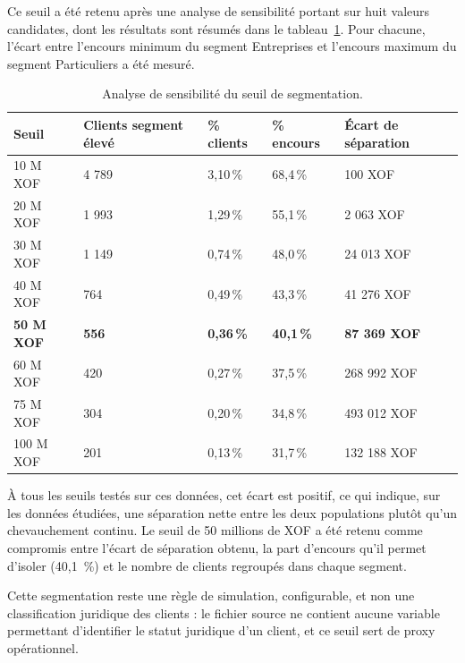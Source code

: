 Ce seuil a été retenu après une analyse de sensibilité portant sur huit valeurs candidates, dont les résultats sont résumés dans le tableau~\ref{tab:seuil-segmentation}. Pour chacune, l'écart entre l'encours minimum du segment Entreprises et l'encours maximum du segment Particuliers a été mesuré.

\begin{table}[htbp]
    \centering
    \footnotesize
    \caption{Analyse de sensibilité du seuil de segmentation.}
    \label{tab:seuil-segmentation}
    \begin{tabular}{p{2.2cm}p{2.8cm}p{1.8cm}p{1.8cm}p{2.8cm}}
        \toprule
        \textbf{Seuil} & \textbf{Clients segment élevé} & \textbf{\% clients} & \textbf{\% encours} & \textbf{Écart de séparation} \\
        \midrule
        10 M XOF & 4 789 & 3,10\,\% & 68,4\,\% & 100 XOF \\
        20 M XOF & 1 993 & 1,29\,\% & 55,1\,\% & 2 063 XOF \\
        30 M XOF & 1 149 & 0,74\,\% & 48,0\,\% & 24 013 XOF \\
        40 M XOF & 764 & 0,49\,\% & 43,3\,\% & 41 276 XOF \\
        \textbf{50 M XOF} & \textbf{556} & \textbf{0,36\,\%} & \textbf{40,1\,\%} & \textbf{87 369 XOF} \\
        60 M XOF & 420 & 0,27\,\% & 37,5\,\% & 268 992 XOF \\
        75 M XOF & 304 & 0,20\,\% & 34,8\,\% & 493 012 XOF \\
        100 M XOF & 201 & 0,13\,\% & 31,7\,\% & 132 188 XOF \\
        \bottomrule
    \end{tabular}
\end{table}

À tous les seuils testés sur ces données, cet écart est positif, ce qui indique, sur les données étudiées, une séparation nette entre les deux populations plutôt qu'un chevauchement continu. Le seuil de 50 millions de XOF a été retenu comme compromis entre l'écart de séparation obtenu, la part d'encours qu'il permet d'isoler (40,1~\%) et le nombre de clients regroupés dans chaque segment.

Cette segmentation reste une règle de simulation, configurable, et non une classification juridique des clients : le fichier source ne contient aucune variable permettant d'identifier le statut juridique d'un client, et ce seuil sert de proxy opérationnel.

